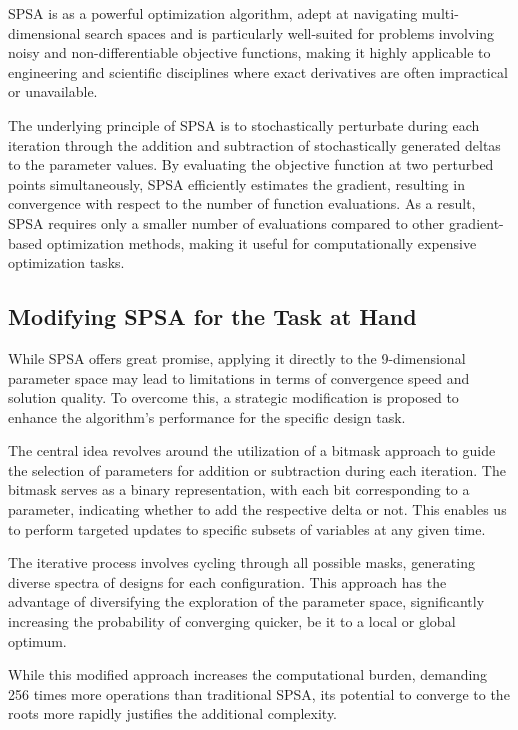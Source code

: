 \documentclass[12pt]{article}
\begin{document}
SPSA is as a powerful optimization algorithm, adept at navigating multi-dimensional search spaces and is particularly well-suited for problems involving noisy and non-differentiable objective functions, making it highly applicable to engineering and scientific disciplines where exact derivatives are often impractical or unavailable.

The underlying principle of SPSA is to stochastically perturbate during each iteration through the addition and subtraction of stochastically generated deltas to the parameter values. By evaluating the objective function at two perturbed points simultaneously, SPSA efficiently estimates the gradient, resulting in  convergence with respect to the number of function evaluations. As a result, SPSA requires only a smaller number of evaluations compared to other gradient-based optimization methods, making it useful for computationally expensive optimization tasks.

\subsection{Modifying SPSA for the Task at Hand}

While SPSA offers great promise, applying it directly to the 9-dimensional parameter space may lead to limitations in terms of convergence speed and solution quality. To overcome this, a strategic modification is proposed to enhance the algorithm's performance for the specific design task.

The central idea revolves around the utilization of a bitmask approach to guide the selection of parameters for addition or subtraction during each iteration. The bitmask serves as a binary representation, with each bit corresponding to a parameter, indicating whether to add the respective delta or not. This enables us to perform targeted updates to specific subsets of variables at any given time.

The iterative process involves cycling through all possible masks, generating diverse spectra of designs for each configuration. This approach has the advantage of diversifying the exploration of the parameter space, significantly increasing the probability of converging quicker, be it to a local or global optimum.

While this modified approach increases the computational burden, demanding 256 times more operations than traditional SPSA, its potential to converge to the roots more rapidly justifies the additional complexity. 
\end{document}
